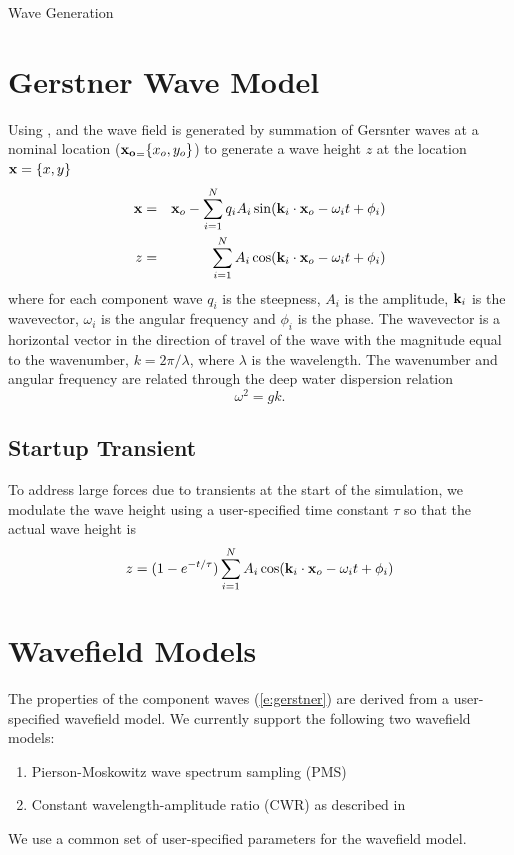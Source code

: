 \documentclass[11pt]{article}
\newcommand{\doctitle}{Wave Generation}
\begin{document}
  

\newpage
\setcounter{page}{1}
\begin{center}
{\huge \doctitle}
\end{center}


\section{Gerstner Wave Model}

Using \cite{tessendorf99simulating}, \cite{gpugems_waves} and \cite{frechot06realistic} the wave field is generated by summation of Gersnter waves at a nominal location ($\mbox{${\bf x_o}_{=}$} \{x_o, y_o\}$) to generate a wave height $z$ at the location $\mbox{${\bf x}$} = \{x, y\}$
\begin{eqnarray}
  \mbox{${\bf x}$} & = & \mbox{${\bf x}_{o}$} - \sum_{i=1}^{N} q_i A_i \sin(\mbox{${\bf k}_{i}$} \cdot \mbox{${\bf x}_{o}$} - \omega_i t + \phi_i) \\
  z & = & \sum_{i=1}^N A_i \cos(\mbox{${\bf k}_{i}$} \cdot \mbox{${\bf x}_{o}$} - \omega_i t + \phi_i)
  \label{e:gerstner}
\end{eqnarray}
where for each component wave $q_i$ is the steepness, $A_i$ is the amplitude, $\mbox{${\bf k}_{i}$}$ is the wavevector, $\omega_i$ is the angular frequency and $\phi_i$ is the phase.  The wavevector is a horizontal vector in the direction of travel of the wave with the magnitude equal to the wavenumber, $k=2\pi/\lambda$, where $\lambda$ is the wavelength.  The wavenumber and angular frequency are related through the deep water dispersion relation
\begin{equation}
  \omega^2 = gk.
\end{equation}

\subsection{Startup Transient}
To address large forces due to transients at the start of the simulation, we modulate the wave height using a user-specified time constant $\tau$ so that the actual wave height is
\begin{equation}
  z  =  (1 - e^{-t/\tau}) \sum_{i=1}^N A_i \cos(\mbox{${\bf k}_{i}$} \cdot \mbox{${\bf x}_{o}$} - \omega_i t + \phi_i)
  \end{equation}

\section{Wavefield Models}

The properties of the component waves (\ref{e:gerstner}) are derived from a user-specified wavefield model.  We currently support the following two wavefield models:
\begin{enumerate}
\item Pierson-Moskowitz wave spectrum sampling (PMS)
\item Constant wavelength-amplitude ratio (CWR) as described in \cite{gpugems_waves}
\end{enumerate}
We use a common set of user-specified parameters for the wavefield model.
\end{document}
